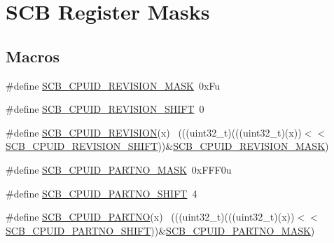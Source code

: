 \hypertarget{group___s_c_b___register___masks}{}\section{S\+CB Register Masks}
\label{group___s_c_b___register___masks}
\subsection*{Macros}
\begin{DoxyCompactItemize}
\item 
\#define \hyperlink{group___s_c_b___register___masks_ga85fcec5a1a285bf2ead09d715e7fd825}{S\+C\+B\+\_\+\+C\+P\+U\+I\+D\+\_\+\+R\+E\+V\+I\+S\+I\+O\+N\+\_\+\+M\+A\+SK}~0x\+Fu
\item 
\#define \hyperlink{group___s_c_b___register___masks_ga6c4bd208cc5af38612bf38b291f8312d}{S\+C\+B\+\_\+\+C\+P\+U\+I\+D\+\_\+\+R\+E\+V\+I\+S\+I\+O\+N\+\_\+\+S\+H\+I\+FT}~0
\item 
\#define \hyperlink{group___s_c_b___register___masks_gad84b7d9f172bb11a61e873c8316feaac}{S\+C\+B\+\_\+\+C\+P\+U\+I\+D\+\_\+\+R\+E\+V\+I\+S\+I\+ON}(x)                                    ~(((uint32\+\_\+t)(((uint32\+\_\+t)(x))$<$$<$\hyperlink{group___s_c_b___register___masks_ga6c4bd208cc5af38612bf38b291f8312d}{S\+C\+B\+\_\+\+C\+P\+U\+I\+D\+\_\+\+R\+E\+V\+I\+S\+I\+O\+N\+\_\+\+S\+H\+I\+FT}))\&\hyperlink{group___s_c_b___register___masks_ga85fcec5a1a285bf2ead09d715e7fd825}{S\+C\+B\+\_\+\+C\+P\+U\+I\+D\+\_\+\+R\+E\+V\+I\+S\+I\+O\+N\+\_\+\+M\+A\+SK})
\item 
\#define \hyperlink{group___s_c_b___register___masks_ga59f6aaadd9ecf7fed4e622ab8052f8d4}{S\+C\+B\+\_\+\+C\+P\+U\+I\+D\+\_\+\+P\+A\+R\+T\+N\+O\+\_\+\+M\+A\+SK}~0x\+F\+F\+F0u
\item 
\#define \hyperlink{group___s_c_b___register___masks_gac28acf4ce5242a53961b9549e7dd0115}{S\+C\+B\+\_\+\+C\+P\+U\+I\+D\+\_\+\+P\+A\+R\+T\+N\+O\+\_\+\+S\+H\+I\+FT}~4
\item 
\#define \hyperlink{group___s_c_b___register___masks_gafa3a6f28ced4e51aab9188686cc87434}{S\+C\+B\+\_\+\+C\+P\+U\+I\+D\+\_\+\+P\+A\+R\+T\+NO}(x)                                        ~(((uint32\+\_\+t)(((uint32\+\_\+t)(x))$<$$<$\hyperlink{group___s_c_b___register___masks_gac28acf4ce5242a53961b9549e7dd0115}{S\+C\+B\+\_\+\+C\+P\+U\+I\+D\+\_\+\+P\+A\+R\+T\+N\+O\+\_\+\+S\+H\+I\+FT}))\&\hyperlink{group___s_c_b___register___masks_ga59f6aaadd9ecf7fed4e622ab8052f8d4}{S\+C\+B\+\_\+\+C\+P\+U\+I\+D\+\_\+\+P\+A\+R\+T\+N\+O\+\_\+\+M\+A\+SK})

\end{DoxyCompactItemize}
